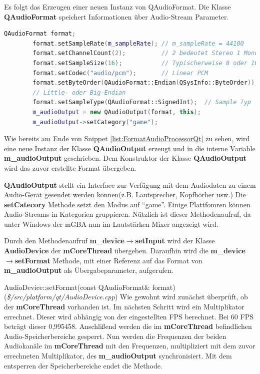 \documentclass[11pt,a4paper]{scrartcl}
\begin{document}
Es folgt das Erzeugen einer neuen Instanz von QAudioFormat. Die Klasse \textbf{QAudioFormat} speichert Informationen \"uber Audio-Stream Parameter.

\vspace{5mm}
\begin{lstlisting}[language=C++, caption={Ausschnitt aus AudioProcessorQt::start()}, label={list:FormatAudioProcessorQt}]
    QAudioFormat format;
		format.setSampleRate(m_sampleRate); // m_sampleRate = 44100
		format.setChannelCount(2);			// 2 bedeutet Stereo 1 Mono
		format.setSampleSize(16);			// Typischerweise 8 oder 16
		format.setCodec("audio/pcm");		// Linear PCM
		format.setByteOrder(QAudioFormat::Endian(QSysInfo::ByteOrder));
		// Little- oder Big-Endian
		format.setSampleType(QAudioFormat::SignedInt);	// Sample Typ
		m_audioOutput = new QAudioOutput(format, this);
		m_audioOutput->setCategory("game");
\end{lstlisting}
  
Wie bereits am Ende von Snippet \ref{list:FormatAudioProcessorQt} zu sehen, wird eine neue Instanz der Klasse \textbf{QAudioOutput} erzeugt und in die interne Variable \textbf{m\_audioOutput} geschrieben. 
Dem Konstruktor der Klasse \textbf{QAudioOutput} wird das zuvor erstellte Format \"ubergeben.

\textbf{QAudioOutput} stellt ein Interface zur Verf\"ugung mit dem Audiodaten zu einem Audio-Ger\"at
gesendet werden k\"onnen(z.B. Lautsprecher, Kopfh\"orher usw.) Die \textbf{setCatecory} Methode setzt den Modus auf \enquote{game}. Einige Plattfomren k\"onnen Audio-Streams in Kategorien gruppieren.
N\"utzlich ist dieser Methodenaufruf, da unter Windows der mGBA nun im Lautst\"arken Mixer angezeigt wird.

Durch den Methodenaufruf \textbf{m\_device$\rightarrow$setInput} wird der Klasse \textbf{AudioDevice} der \textbf{mCoreThread} \"ubergeben. Daraufhin wird die \textbf{m\_device$\rightarrow$setFormat} Methode, mit einer Referenz auf
das Format von \textbf{m\_audioOutput} als \"Ubergabeparameter, aufgerufen.

\newpage

\vspace{5mm}
\large AudioDevice::setFormat(const QAudioFormat\& format) \normalsize(\textit{\$/src/platform/qt/AudioDevice.cpp})
\vspace{2mm}\newline 
Wie gewohnt wird zun\"achst \"uberpr\"uft, ob der \textbf{mCoreThread} vorhanden ist. Im n\"achsten Schritt wird ein Multiplikator errechnet. Dieser wird abh\"angig von der eingestellten FPS berechnet. Bei 60 FPS betr\"agt dieser
0,995458. Anschli{\ss}end werden die im \textbf{mCoreThread} befindlichen Audio-Speicherbereiche gesperrt. Nun werden die Frequenzen der beiden Audiokan\"ale im \textbf{mCoreThread} mit den Frequenzen, multipliziert mit dem zuvor errechneten
Multiplikator, des \textbf{m\_audioOutput} synchronisiert. Mit dem entsperren der Speicherbereiche endet die Methode.
\end{document}
